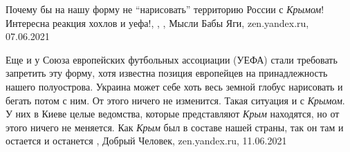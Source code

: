 Почему бы на нашу форму не \enquote{нарисовать} территорию России с \emph{Крымом}! Интересна реакция хохлов и уефа!,
,
, Мысли Бабы Яги, zen.yandex.ru, 07.06.2021

Еще и у Союза европейских футбольных ассоциации (УЕФА) стали требовать
запретить эту форму, хотя известна позиция европейцев на принадлежность нашего
полуострова. Украина может себе хоть весь земной глобус нарисовать и бегать
потом с ним. От этого ничего не изменится. Такая ситуация и с \emph{Крымом}. У них в
Киеве целые ведомства, которые представляют \emph{Крым} находятся, но от этого ничего
не меняется. Как \emph{Крым} был в составе нашей страны, так он там и остается и
останется
, 
Добрый Человек, zen.yandex.ru, 11.06.2021


